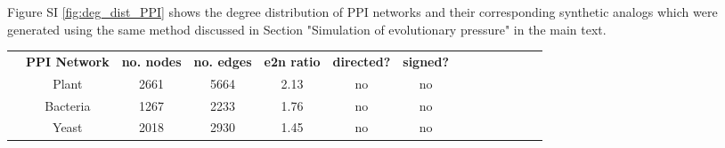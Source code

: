 \documentclass[12pt]{article}	%
\newcommand{\myPadTop}{6.5pt}
\newcommand{\myPadBottom}{4pt}
\begin{document}
    Figure SI \ref{fig:deg_dist_PPI} shows the degree distribution of PPI networks and their corresponding synthetic analogs which were generated using the same method discussed in Section "Simulation of evolutionary pressure" in the main text.
    \newpage
    \begin{table}[H]%
        \centering
		\setlength\arrayrulewidth{.1pt}%
		\scriptsize %
			\setlength\cellspacetoplimit{\myPadTop} %
			\setlength\cellspacebottomlimit{\myPadBottom} %
			\begin{tabular}{@{}Sc Sc|Sc|Sc|Sc|Sc|Sc@{}}  %
					& \textbf{\normalsize PPI Network} & \textbf{\normalsize no. nodes } & \textbf{\normalsize no. edges }	& \textbf{\normalsize e2n ratio } & \textbf{\normalsize directed? } & \textbf{\normalsize signed? }
                        \\[.05cm] 
                            & Plant  \cite{consortium_evidence_2011}  &  2661  &  5664  &  2.13  & no & no %
        				\\[.05cm] \cline{2-7}
        					& Bacteria  \cite{rajagopala_binary_2014} &  1267  &  2233   &  1.76  & no & no %
        				\\[.05cm] 
        					& Yeast  \cite{yu_high-quality_2008}      &  2018  &  2930   &  1.45  & no & no %
        				\\[.05cm] 

\end{tabular}
\end{table}
\end{document}
